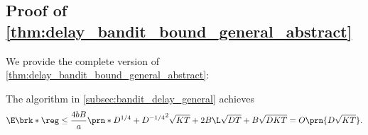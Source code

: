\subsection{Proof of \cref{thm:delay_bandit_bound_general_abstract}}\label{app:bandit_delayed_general}
We provide the complete version of \cref{thm:delay_bandit_bound_general_abstract}:
\begin{theorem}
    The algorithm in \cref{subsec:bandit_delay_general} achieves
\begin{equation*}
    \E\brk*{\reg}
    \leq \frac{4bB}{a}\prn*{D^{1/4}+D^{-1/4}}^2\sqrt{KT}+2B \L\sqrt{D T}+B\sqrt{DKT}
    = O\prn{D\sqrt{KT}}
    .
\end{equation*}
\end{theorem}


